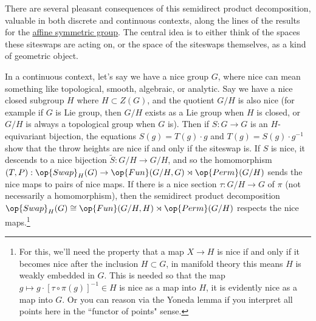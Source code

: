 \documentclass[12nt]{article}
\theoremstyle{plain}
\begin{document}
%
%

There are several pleasant consequences of this semidirect product decomposition, valuable in both discrete and continuous contexts, along the lines of the results for the \underline{\textcolor{blue}{\href{https://en.wikipedia.org/wiki/Affine_symmetric_group}{affine symmetric group}}}. The central idea is to either think of the spaces these siteswaps are acting on, or the space of the siteswaps themselves, as a kind of geometric object.

In a continuous context, let's say we have a nice group $G$, where nice can mean something like topological, smooth, algebraic, or analytic. Say we have a nice closed subgroup $H$ where $H \subset Z(G)$, and the quotient $G/H$ is also nice (for example if $G$ is Lie group, then $G/H$ exists as a Lie group when $H$ is closed, or $G/H$ is always a topological group when $G$ is). Then if $S : G \to G$ is an $H$-equivariant bijection, the equations $S(g) = T(g) \cdot g$ and $T(g) = S(g) \cdot g^{-1}$ show that the throw heights are nice if and only if the siteswap is. If $S$ is nice, it descends to a nice bijection $\widetilde{S} : G/H \to G/H$, and so the homomorphism $(T, P) : \op{Swap}_H(G) \to \op{Fun}(G/H, G) \rtimes \op{Perm}(G/H)$ sends the nice maps to pairs of nice maps. If there is a nice section $\tau : G/H \to G$ of $\pi$ (not necessarily a homomorphism), then the semidirect product decomposition $\op{Swap}_H(G) \cong \op{Fun}(G/H, H) \rtimes \op{Perm}(G/H)$ respects the nice maps.\footnote{For this, we'll need the property that a map $X \to H$ is nice if and only if it becomes nice after the inclusion $H \subset G$, in manifold theory this means $H$ is weakly embedded in $G$. This is needed so that the map $g \mapsto g \cdot [\tau \circ \pi(g)]^{-1} \in H$ is nice as a map into $H$, it is evidently nice as a map into $G$. Or you can reason via the Yoneda lemma if you interpret all points here in the ``functor of points" sense.} 
\end{document}
